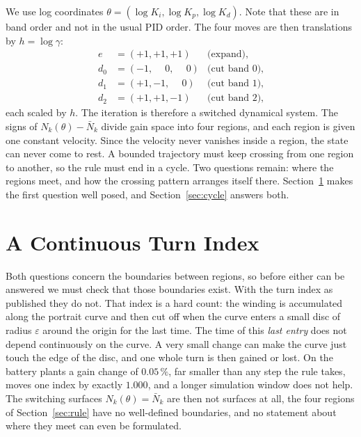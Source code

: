 \documentclass[letterpaper, 10pt, conference, twocolumn]{ieeeconf}
\newcommand{\Nbar}{\bar{N}}
\begin{document}
We use log coordinates $\theta = (\log K_i, \log K_p, \log K_d)$. Note that
these are in band order and not in the usual PID order. The four moves are then
translations by $h = \log\gamma$:
\begin{equation}
\begin{aligned}
e   &= (+1, +1, +1) &\text{(expand),}\\
d_0 &= (-1, \phantom{+}0, \phantom{+}0) &\text{(cut band 0),}\\
d_1 &= (+1, -1, \phantom{+}0) &\text{(cut band 1),}\\
d_2 &= (+1, +1, -1) &\text{(cut band 2),}
\end{aligned}
\label{eq:moves}
\end{equation}
each scaled by $h$. The iteration is therefore a switched dynamical system.
The signs of $N_k(\theta) - \Nbar_k$ divide gain space into four regions, and
each region is given one constant velocity. Since the velocity never vanishes
inside a region, the state can never come to rest. A bounded trajectory must
keep crossing from one region to another, so the rule must end in a cycle. Two
questions remain: where the regions meet, and how the crossing pattern arranges
itself there. Section~\ref{sec:index} makes the first question well posed, and
Section~\ref{sec:cycle} answers both.

\section{A Continuous Turn Index}
\label{sec:index}

Both questions concern the boundaries between regions, so before either can be
answered we must check that those boundaries exist. With the turn index as
published they do not. That index is a hard count: the
winding is accumulated along the portrait curve and then cut off when the curve
enters a small disc of radius $\varepsilon$ around the origin for the last
time. The time of this \emph{last entry} does not depend continuously on the
curve. A very small change can make the curve just touch the edge of the disc,
and one whole turn is then gained or lost. On the battery plants a gain change
of $0.05\,\%$, far smaller than any step the rule takes, moves one index by
exactly $1.000$, and a longer simulation window does not help. The switching
surfaces $N_k(\theta) = \Nbar_k$ are then not surfaces at all, the four regions
of Section~\ref{sec:rule} have no well-defined boundaries, and no statement
about where they meet can even be formulated.
\end{document}
